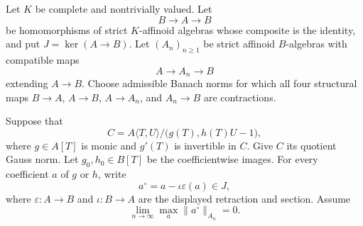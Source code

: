 \begin{lemma}
\label{lem:p061-v3-contractive-standard-etale-tube}
Let \(K\) be complete and nontrivially valued. Let
\[
                         B\longrightarrow A\longrightarrow B
\]
be homomorphisms of strict \(K\)-affinoid algebras whose composite is the
identity, and put \(J=\ker(A\to B)\). Let \((A_n)_{n\geq1}\) be strict
affinoid \(B\)-algebras with compatible maps
\[
                         A\longrightarrow A_n\longrightarrow B
\]
extending \(A\to B\). Choose admissible Banach norms for which all four
structural maps \(B\to A\), \(A\to B\), \(A\to A_n\), and
\(A_n\to B\) are contractions.

Suppose that
\begin{equation}\label{eq:p061-v3-standard-etale-presentation}
 C=A\langle T,U\rangle/
       \bigl(g(T),h(T)U-1\bigr),
\end{equation}
where \(g\in A[T]\) is monic and \(g'(T)\) is invertible in \(C\).
Give \(C\) its quotient Gauss norm. Let \(g_0,h_0\in B[T]\) be the
coefficientwise images. For every coefficient \(a\) of \(g\) or \(h\),
write
\[
                         a^\circ=a-\iota\varepsilon(a)\in J,
\]
where \(\varepsilon:A\to B\) and \(\iota:B\to A\) are the displayed
retraction and section. Assume
\begin{equation}\label{eq:p061-v3-coefficient-contraction}
 \lim_{n\to\infty}
 \max_a\bigl\|a^\circ\bigr\|_{A_n}=0.
\end{equation}


\end{lemma}
